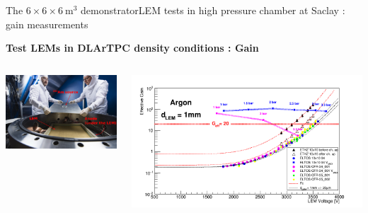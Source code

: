 \documentclass[10pt]{beamer}
\begin{document}
    \begin{frame}{The \texorpdfstring{$6 \times 6 \times \SI{6}{\meter\cubed}$}{666} demonstrator}{LEM tests in high pressure chamber at Saclay : gain measurements}
    	\begin{scriptsize}
    		\begin{center}\textbf{Test LEMs in DLArTPC density conditions : Gain}\end{center}
    		\begin{columns}
    			\begin{column}{0.42\textwidth}
    				\centering \includegraphics[width=\textwidth]{figures/666/gamelle_source.png}
    			\end{column}\hfill
    			\begin{column}{0.58\textwidth}
    				\centering \includegraphics[width=\textwidth]{figures/666/gain.png}
    			\end{column}
    		\end{columns}\vfill
    		\begin{columns}

\end{columns}
\end{scriptsize}
\end{frame}
\end{document}
